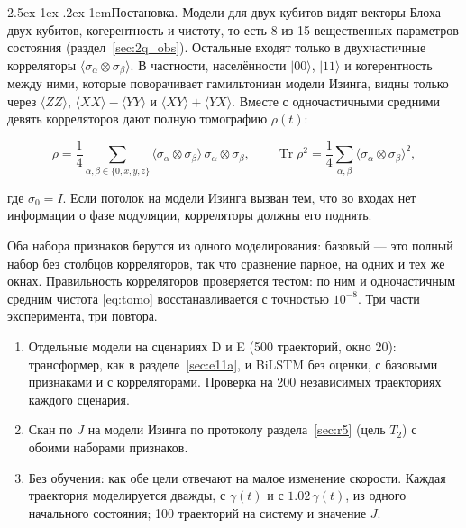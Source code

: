 \documentclass[12pt,a4paper]{report}
\makeatletter
\renewcommand\paragraph{\@startsection{paragraph}{4}{\z@}%
  {2.5ex \@plus1ex \@minus.2ex}{-1em}{\normalfont\normalsize\bfseries}}
\numberwithin{equation}{chapter}
\newcommand{\Tr}{\operatorname{Tr}}
\makeatother
\begin{document}
\paragraph{Постановка.} Модели для двух кубитов видят векторы Блоха двух
кубитов, когерентность и чистоту, то есть 8 из 15 вещественных параметров
состояния (раздел~\ref{sec:2q_obs}). Остальные входят только в
двухчастичные корреляторы $\langle\sigma_\alpha\otimes\sigma_\beta\rangle$. В
частности, населённости $|00\rangle$, $|11\rangle$ и когерентность между ними,
которые поворачивает гамильтониан модели Изинга, видны только через
$\langle ZZ\rangle$, $\langle XX\rangle-\langle YY\rangle$ и
$\langle XY\rangle+\langle YX\rangle$. Вместе с одночастичными средними девять
корреляторов дают полную томографию $\rho(t)$:
\begin{keybox}
\begin{equation}
\rho=\frac14\sum_{\alpha,\beta\in\{0,x,y,z\}}
\langle\sigma_\alpha\otimes\sigma_\beta\rangle\,\sigma_\alpha\otimes\sigma_\beta ,
\qquad
\Tr\rho^2=\frac14\sum_{\alpha,\beta}\langle\sigma_\alpha\otimes\sigma_\beta\rangle^2,
\label{eq:tomo}
\end{equation}
\end{keybox}
где $\sigma_0=I$. Если потолок на модели Изинга вызван тем, что во входах
нет информации о фазе модуляции, корреляторы должны его поднять.

Оба набора признаков берутся из одного моделирования: базовый --- это
полный набор без столбцов корреляторов, так что сравнение парное, на
одних и тех же окнах. Правильность корреляторов проверяется тестом:
по ним и одночастичным средним чистота \eqref{eq:tomo} восстанавливается с
точностью $10^{-8}$. Три части эксперимента, три повтора.
\begin{enumerate}
\item Отдельные модели на сценариях D и E (500 траекторий, окно 20):
      трансформер, как в разделе~\ref{sec:e11a}, и BiLSTM без оценки, с
      базовыми признаками и с корреляторами. Проверка на 200 независимых
      траекториях каждого сценария.
\item Скан по $J$ на модели Изинга по протоколу раздела~\ref{sec:r5}
      (цель $T_2$) с обоими наборами признаков.
\item Без обучения: как обе цели отвечают на малое изменение скорости.
      Каждая траектория моделируется дважды, с $\gamma(t)$ и с
      $1.02\,\gamma(t)$, из одного начального состояния; 100 траекторий на
      систему и значение $J$.
\end{enumerate}
\end{document}
